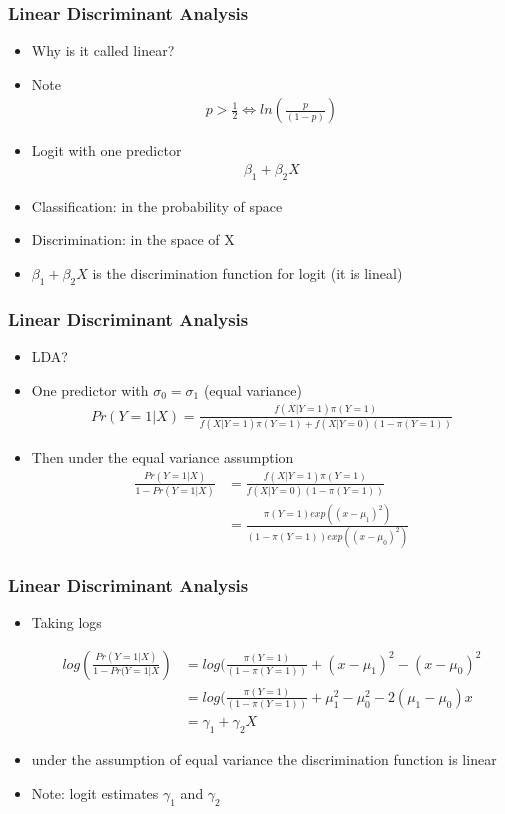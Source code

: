 \documentclass[
  shownotes,
  xcolor={svgnames},
  hyperref={colorlinks,citecolor=DarkBlue,linkcolor=andesred,urlcolor=DarkBlue}
  , aspectratio=169]{beamer}
\begin{document}
\begin{frame}[fragile]
\frametitle{Linear Discriminant Analysis}

\begin{itemize}
  \item Why is it called linear?
  \item Note
  \begin{align}
    p>\frac{1}{2} \iff ln(\frac{p}{(1-p)})
  \end{align}
  \item Logit with one predictor
  \begin{align}
  \beta_1 + \beta_2 X
  \end{align}
  \item Classification: in the probability of space
  \item Discrimination: in the space of X
  \item $\beta_1 +\beta_2 X$ is the discrimination function for logit (it is lineal)
\end{itemize}

\end{frame}
\begin{frame}[fragile]
\frametitle{Linear Discriminant Analysis}
\begin{itemize}
  \item LDA?
  \item One predictor with $\sigma_0 = \sigma_1$ (equal variance)
  \begin{align}
  Pr (Y=1|X)=\frac{f(X|Y=1)\pi(Y=1)}{f(X|Y=1)\pi(Y=1) + f(X|Y=0)(1-\pi(Y=1))}
  \end{align}
  \item Then under the equal variance assumption
  \begin{align}
  \frac{Pr (Y=1|X)}{1-Pr(Y=1|X)} &= \frac{f(X|Y=1)\pi(Y=1)}{f(X|Y=0)(1-\pi(Y=1))} \\
                                &= \frac{\pi(Y=1)exp((x-\mu_1)^2)}{(1-\pi(Y=1))exp((x-\mu_0)^2)} 
  \end{align}
\end{itemize}

\end{frame}
\begin{frame}[fragile]
\frametitle{Linear Discriminant Analysis}
\begin{itemize}
  \item Taking logs

\begin{align}
  log \left( \frac{Pr(Y=1|X)}{1-Pr(Y=1|X}\right)  &= log(\frac{\pi(Y=1)}{(1-\pi(Y=1))}+(x-\mu_1)^2-(x-\mu_0)^2 \\
  &= log(\frac{\pi(Y=1)}{(1-\pi(Y=1))}+\mu^2_1-\mu^2_0-2(\mu_1-\mu_0)x \\
  &= \gamma_1 +\gamma_2 X
  \end{align}  
  \item under the assumption of equal variance the discrimination function is linear
  \item Note: logit estimates $\gamma_1$ and $\gamma_2$
\end{itemize}
\end{frame}
\end{document}
